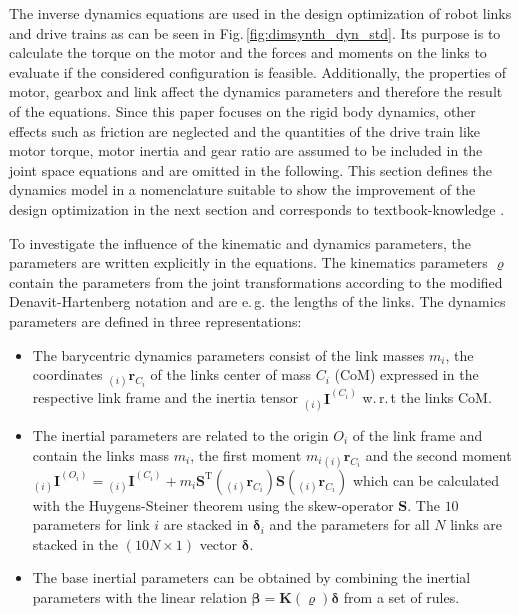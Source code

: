 \documentclass{svproc}
\newcommand{\bm}[1]{\boldsymbol{#1}}
\newcommand{\ortvek}[4]{{ }_{(#1)}{\boldsymbol{#2}}^{#3}_{#4} }
\newcommand{\transp}[0]{{\mathrm{T}}}
\begin{document}
The inverse dynamics equations are used in the design optimization of robot links and drive trains as can be seen in Fig.\,\ref{fig:dimsynth_dyn_std}.
Its purpose is to calculate the torque on the motor and the forces and moments on the links to evaluate if the considered configuration is feasible.
Additionally, the properties of motor, gearbox and link affect the dynamics parameters and therefore the result of the equations.
Since this paper focuses on the rigid body dynamics, other effects such as friction are neglected and the quantities of the drive train like motor torque, motor inertia and gear ratio are assumed to be included in the joint space equations and are omitted in the following.
This section defines the dynamics model in a nomenclature suitable to show the improvement of the design optimization in the next section and corresponds to textbook-knowledge \cite{KhalilDom2002}.

To investigate the influence of the kinematic and dynamics parameters, the parameters are written explicitly in the equations.
The kinematics parameters $\bm{\varrho}$ contain the parameters from the joint transformations according to the modified Denavit-Hartenberg notation and are e.\,g. the lengths of the links.
%
The dynamics parameters are defined in three representations:
\begin{itemize}
\item The barycentric dynamics parameters consist of the link masses $m_i$, the coordinates $\ortvek{i}{r}{}{C_i}$ of the links center of mass $C_i$ (CoM)  expressed in the respective link frame and the inertia tensor $\ortvek{i}{I}{(C_i)}{}$ w.\,r.\,t the links CoM. 
\item The inertial parameters are related to the origin $O_i$ of the link frame and contain the links mass $m_i$, the first moment $m_i \ortvek{i}{r}{}{C_i}$ and the second moment $\ortvek{i}{I}{(O_i)}{}=\ortvek{i}{I}{(C_i)}{}+m_i\bm{S}^\transp(\ortvek{i}{r}{}{C_i})\bm{S}(\ortvek{i}{r}{}{C_i})$ which can be calculated with the Huygens-Steiner theorem using the skew-operator $\bm{S}$.
The $10$ parameters for link $i$ are stacked in $\bm{\delta}_i$ and the parameters for all $N$ links are stacked in the $(10N \times 1)$ vector $\bm{\delta}$.
\item The base inertial parameters can be obtained by combining the inertial parameters with the linear relation $\bm{\beta}=\bm{K}(\bm{\varrho})\bm{\delta}$ from a set of rules.
\end{itemize}
%
\end{document}
